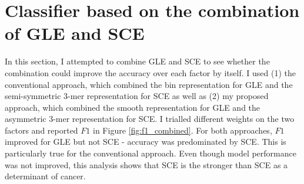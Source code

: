 

\section{Classifier based on the combination of GLE and SCE}\label{ml:both}
In this section, I attempted to combine GLE and SCE to see whether the combination could improve the accuracy over each factor by itself. I used (1) the conventional approach, which combined the bin representation for GLE and the semi-symmetric 3-mer representation for SCE as well as (2) my proposed approach, which combined the smooth representation for GLE and the asymmetric 3-mer representation for SCE. I trialled different weights on the two factors and reported $F1$ in Figure \ref{fig:f1_combined}. For both approaches, $F1$ improved for GLE but not SCE - accuracy was predominated by SCE. This is particularly true for the conventional approach. Even though model performance was not improved, this analysis shows that SCE is the stronger than SCE as a determinant of cancer.

